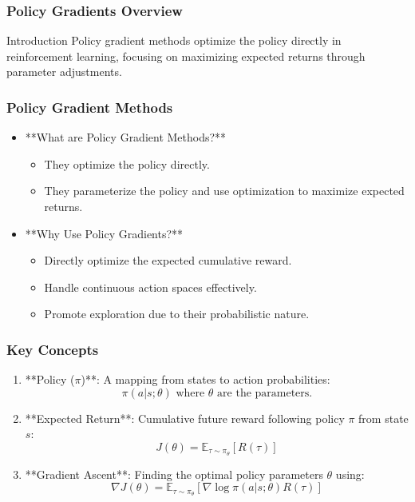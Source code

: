 \documentclass[aspectratio=169]{beamer}
\begin{document}
\begin{frame}[fragile]
  \frametitle{Policy Gradients Overview}
  \begin{block}{Introduction}
    Policy gradient methods optimize the policy directly in reinforcement learning, focusing on maximizing expected returns through parameter adjustments.
  \end{block}
\end{frame}

\begin{frame}[fragile]
  \frametitle{Policy Gradient Methods}
  \begin{itemize}
    \item **What are Policy Gradient Methods?**
      \begin{itemize}
        \item They optimize the policy directly.
        \item They parameterize the policy and use optimization to maximize expected returns.
      \end{itemize}
    
    \item **Why Use Policy Gradients?**
      \begin{itemize}
        \item Directly optimize the expected cumulative reward.
        \item Handle continuous action spaces effectively.
        \item Promote exploration due to their probabilistic nature.
      \end{itemize}      
  \end{itemize}
\end{frame}

\begin{frame}[fragile]
  \frametitle{Key Concepts}
  \begin{enumerate}
    \item **Policy (\(\pi\))**: A mapping from states to action probabilities:
      \[
      \pi(a|s; \theta) \text{ where } \theta \text{ are the parameters.}
      \]

    \item **Expected Return**: Cumulative future reward following policy \(\pi\) from state \(s\):
      \[
      J(\theta) = \mathbb{E}_{\tau \sim \pi_{\theta}} \left[ R(\tau) \right]
      \]

    \item **Gradient Ascent**: Finding the optimal policy parameters \(\theta\) using:
      \[
      \nabla J(\theta) = \mathbb{E}_{\tau \sim \pi_{\theta}} \left[ \nabla \log \pi(a|s; \theta) R(\tau) \right]
      \]
  \end{enumerate}
\end{frame}
\end{document}
